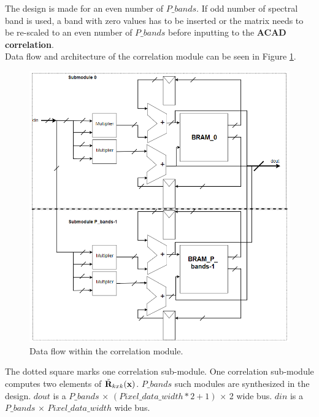 
The design is made for an even number of $P\_bands$. If odd number of spectral band is used, a band with zero values has to be inserted or the matrix needs to be re-scaled to an even number of $P\_bands$ before inputting to the \textbf{ACAD correlation}.\\


Data flow and architecture of the correlation module can be seen in Figure \ref{fig:data_flow_correlation}. 


\begin{figure}[H]
\centering
   \includegraphics[scale=0.4]{images/correlation_data_path.PNG}
  \caption{Data flow within the correlation module.  } 
  \label{fig:data_flow_correlation}
\end{figure}

The dotted square marks one correlation sub-module. One correlation sub-module computes two elements of  $\Tilde{\textbf{R}}_{k x k}(\textbf{x})$.  $P\_bands$ such modules are synthesized in the design. $dout$ is a $P\_bands$ $\times$
$(Pixel\_data\_width*2+1)$ $\times$ 2 wide bus. $din$ is a $P\_bands$ $\times$
$Pixel\_data\_width$ wide bus.





